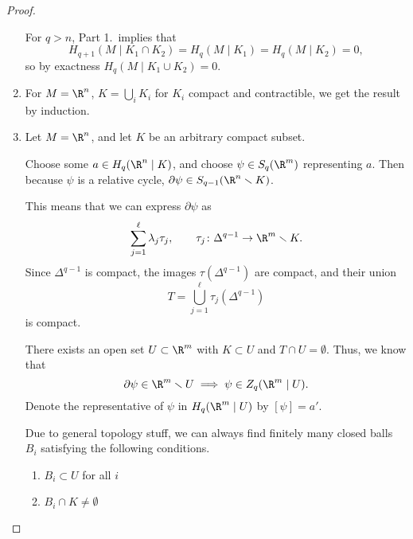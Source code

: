 \documentclass[main.tex]{subfiles}
\begin{document}
\begin{proof}
\begin{enumerate}
      For \(q > n\), Part 1.\ implies that
      \begin{equation*}
        H_{q+1}(M\mid K_{1} \cap K_{2}) = H_{q}(M \mid K_{1}) = H_{q}(M \mid K_{2}) = 0,
      \end{equation*}
      so by exactness \(H_{q}(M \mid K_{1} \cup K_{2}) = 0\).

    \item For \(M = \R^{n}\), \(K = \bigcup_{i} K_{i}\) for \(K_{i}\) compact and contractible, we get the result by induction.

    \item Let \(M = \R^{n}\), and let \(K\) be an arbitrary compact subset.

      Choose some \(a \in H_{q}(\R^{n} \mid K)\), and choose \(\psi \in S_{q}(\R^{m})\) representing \(a\). Then because \(\psi\) is a relative cycle, \(\partial \psi \in S_{q-1}(\R^{n} \smallsetminus K)\).

      This means that we can express \(\partial \psi\) as
      \begin{equation*}
        \sum_{j = 1}^{\ell} \lambda_{j} \tau_{j},\qquad \tau_{j}\colon \Delta^{q-1} \to \R^{m} \smallsetminus K.
      \end{equation*}
      Since \(\Delta^{q-1}\) is compact, the images \(\tau(\Delta^{q-1})\) are compact, and their union
      \begin{equation*}
        T = \bigcup_{j = 1}^{\ell} \tau_{j}(\Delta^{q-1})
      \end{equation*}
      is compact.

      There exists an open set \(U \subset \R^{m}\) with \(K \subset U\) and \(T \cap U = \emptyset\). Thus, we know that
      \begin{equation*}
        \partial \psi \in \R^{m} \smallsetminus U \implies \psi \in Z_{q}(\R^{m} \mid U).
      \end{equation*}
      Denote the representative of \(\psi\) in \(H_{q}(\R^{m} \mid U)\) by \([\psi] = a'\).

      Due to general topology stuff, we can always find finitely many closed balls \(B_{i}\) satisfying the following conditions.
      \begin{enumerate}
        \item \(B_{i} \subset U\) for all \(i\)

        \item \(B_{i} \cap K \neq \emptyset\)


\end{enumerate}
\end{enumerate}
\end{proof}
\end{document}
